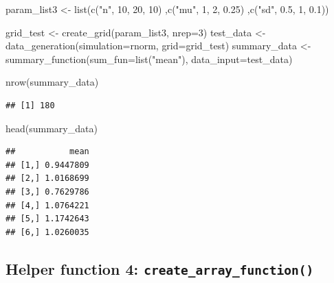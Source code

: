 \documentclass[11pt,a4paper]{article}
\newenvironment{Shaded}{\begin{snugshade}}{\end{snugshade}}
\newcommand{\AttributeTok}[1]{\textcolor[rgb]{0.77,0.63,0.00}{#1}}
\newcommand{\DecValTok}[1]{\textcolor[rgb]{0.00,0.00,0.81}{#1}}
\newcommand{\FloatTok}[1]{\textcolor[rgb]{0.00,0.00,0.81}{#1}}
\newcommand{\FunctionTok}[1]{\textcolor[rgb]{0.00,0.00,0.00}{#1}}
\newcommand{\NormalTok}[1]{#1}
\newcommand{\OtherTok}[1]{\textcolor[rgb]{0.56,0.35,0.01}{#1}}
\newcommand{\StringTok}[1]{\textcolor[rgb]{0.31,0.60,0.02}{#1}}
\begin{document}
\begin{Shaded}
\begin{Highlighting}[]
\NormalTok{param\_list3 }\OtherTok{\textless{}{-}} \FunctionTok{list}\NormalTok{(}\FunctionTok{c}\NormalTok{(}\StringTok{"n"}\NormalTok{, }\DecValTok{10}\NormalTok{, }\DecValTok{20}\NormalTok{, }\DecValTok{10}\NormalTok{)}
\NormalTok{                    ,}\FunctionTok{c}\NormalTok{(}\StringTok{"mu"}\NormalTok{, }\DecValTok{1}\NormalTok{, }\DecValTok{2}\NormalTok{, }\FloatTok{0.25}\NormalTok{)}
\NormalTok{                    ,}\FunctionTok{c}\NormalTok{(}\StringTok{"sd"}\NormalTok{, }\FloatTok{0.5}\NormalTok{, }\DecValTok{1}\NormalTok{, }\FloatTok{0.1}\NormalTok{))}

\NormalTok{grid\_test }\OtherTok{\textless{}{-}} \FunctionTok{create\_grid}\NormalTok{(param\_list3, }\AttributeTok{nrep=}\DecValTok{3}\NormalTok{)}
\NormalTok{test\_data }\OtherTok{\textless{}{-}} \FunctionTok{data\_generation}\NormalTok{(}\AttributeTok{simulation=}\NormalTok{rnorm, }\AttributeTok{grid=}\NormalTok{grid\_test)}
\NormalTok{summary\_data }\OtherTok{\textless{}{-}} \FunctionTok{summary\_function}\NormalTok{(}\AttributeTok{sum\_fun=}\FunctionTok{list}\NormalTok{(}\StringTok{"mean"}\NormalTok{),}
                                 \AttributeTok{data\_input=}\NormalTok{test\_data)}

\FunctionTok{nrow}\NormalTok{(summary\_data)}
\end{Highlighting}
\end{Shaded}

\begin{verbatim}
## [1] 180
\end{verbatim}

\begin{Shaded}
\begin{Highlighting}[]
\FunctionTok{head}\NormalTok{(summary\_data)}
\end{Highlighting}
\end{Shaded}

\begin{verbatim}
##           mean
## [1,] 0.9447809
## [2,] 1.0168699
## [3,] 0.7629786
## [4,] 1.0764221
## [5,] 1.1742643
## [6,] 1.0260035
\end{verbatim}

\hypertarget{helper-function-4-create_array_function}{%
\subsection{\texorpdfstring{Helper function 4:
\texttt{create\_array\_function()}}{Helper function 4: create\_array\_function()}}\label{helper-function-4-create_array_function}}
\end{document}
